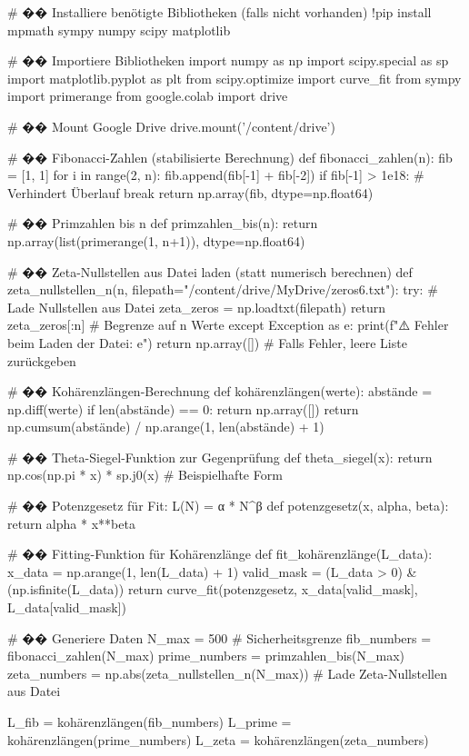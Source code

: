 # �� Installiere benötigte Bibliotheken (falls nicht vorhanden)
!pip install mpmath sympy numpy scipy matplotlib

# �� Importiere Bibliotheken
import numpy as np
import scipy.special as sp
import matplotlib.pyplot as plt
from scipy.optimize import curve_fit
from sympy import primerange
from google.colab import drive

# �� Mount Google Drive
drive.mount('/content/drive')

# �� Fibonacci-Zahlen (stabilisierte Berechnung)
def fibonacci_zahlen(n):
    fib = [1, 1]
    for i in range(2, n):
        fib.append(fib[-1] + fib[-2])
        if fib[-1] > 1e18:  # Verhindert Überlauf
            break
    return np.array(fib, dtype=np.float64)

# �� Primzahlen bis n
def primzahlen_bis(n):
    return np.array(list(primerange(1, n+1)), dtype=np.float64)

# �� Zeta-Nullstellen aus Datei laden (statt numerisch berechnen)
def zeta_nullstellen_n(n, filepath="/content/drive/MyDrive/zeros6.txt"):
    try:
        # Lade Nullstellen aus Datei
        zeta_zeros = np.loadtxt(filepath)
        return zeta_zeros[:n]  # Begrenze auf n Werte
    except Exception as e:
        print(f"⚠️ Fehler beim Laden der Datei: {e}")
        return np.array([])  # Falls Fehler, leere Liste zurückgeben

# �� Kohärenzlängen-Berechnung
def kohärenzlängen(werte):
    abstände = np.diff(werte)
    if len(abstände) == 0:
        return np.array([])
    return np.cumsum(abstände) / np.arange(1, len(abstände) + 1)

# �� Theta-Siegel-Funktion zur Gegenprüfung
def theta_siegel(x):
    return np.cos(np.pi * x) * sp.j0(x)  # Beispielhafte Form

# �� Potenzgesetz für Fit: L(N) = α * N^β
def potenzgesetz(x, alpha, beta):
    return alpha * x**beta

# �� Fitting-Funktion für Kohärenzlänge
def fit_kohärenzlänge(L_data):
    x_data = np.arange(1, len(L_data) + 1)
    valid_mask = (L_data > 0) & (np.isfinite(L_data))
    return curve_fit(potenzgesetz, x_data[valid_mask], L_data[valid_mask])

# �� Generiere Daten
N_max = 500  # Sicherheitsgrenze
fib_numbers = fibonacci_zahlen(N_max)
prime_numbers = primzahlen_bis(N_max)
zeta_numbers = np.abs(zeta_nullstellen_n(N_max))  # Lade Zeta-Nullstellen aus Datei

L_fib = kohärenzlängen(fib_numbers)
L_prime = kohärenzlängen(prime_numbers)
L_zeta = kohärenzlängen(zeta_numbers)


